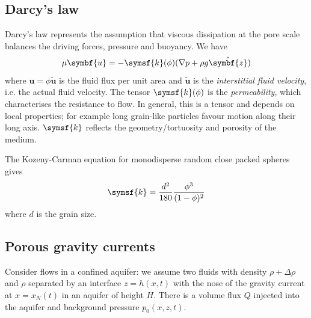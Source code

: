 \documentclass{jknotes}
\renewcommand{\u}{\symbf{u}}
\begin{document}
\subsection{Darcy's law}
Darcy's law represents the assumption that viscous dissipation at the pore
scale balances the driving forces, pressure and buoyancy. We have
\begin{equation}
	\mu \u = - \symsf{k}(\phi)(\nabla p + \rho g \hat{\symbf{z}})
\end{equation}
where $\u = \phi \tilde{\u}$ is the fluid flux per unit area and $\tilde{\u}$
is the \emph{interstitial fluid velocity}, i.e. the actual fluid velocity. The
tensor $\symsf{k}(\phi)$ is the \emph{permeability}, which characterises
the resistance to flow. In general, this is a tensor and depends on local
properties; for example long grain-like particles favour motion along their
long axis. $\symsf{k}$ reflects the geometry/tortuosity and porosity of the
medium. 
\begin{eg}
	The Kozeny-Carman equation for monodisperse random close packed spheres
	gives
	\begin{equation}
		\symsf{k} = \frac{d^2}{180} \frac{\phi^3}{(1-\phi)^2}
	\end{equation}
	where $d$ is the grain size.
\end{eg}

\subsection{Porous gravity currents}
Consider flows in a confined aquifer: we assume two fluids with density $\rho
+ \Delta \rho$ and $\rho$ separated by an interface $z=h(x,t)$ with the nose of
the gravity current at $x = x_N(t)$ in an aquifer of height $H$. There is a
volume flux $Q$ injected into the aquifer and background pressure $p_0(x,z,t)$.

\begin{center}
\end{center}
\end{document}
